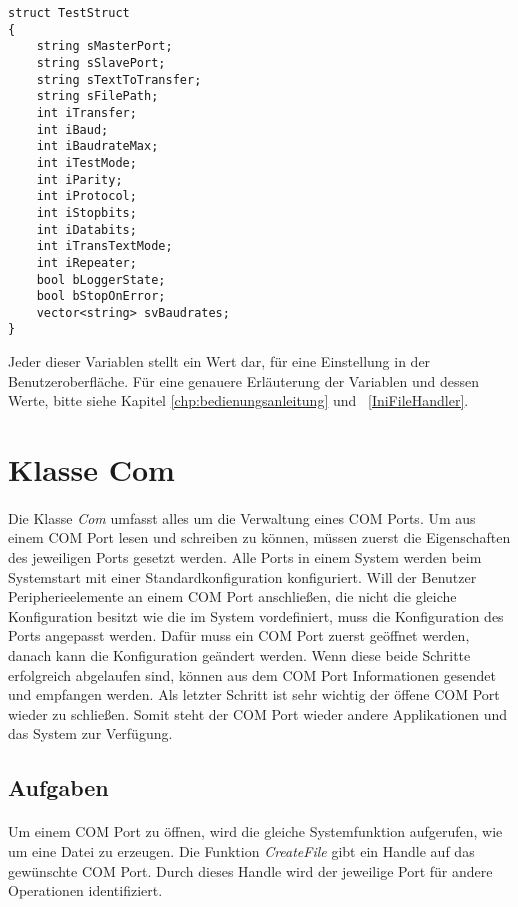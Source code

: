 \begin{lstlisting}	 
struct TestStruct
{
	string sMasterPort;
	string sSlavePort;
	string sTextToTransfer;
	string sFilePath;
	int iTransfer;
	int iBaud;
	int iBaudrateMax;
	int iTestMode;
	int iParity;
	int iProtocol;
	int iStopbits;
	int iDatabits;
	int iTransTextMode;
	int iRepeater;
	bool bLoggerState;
	bool bStopOnError;
	vector<string> svBaudrates;
}
\end{lstlisting}

Jeder dieser Variablen stellt ein Wert dar, für eine Einstellung in der Benutzeroberfläche. Für eine genauere Erläuterung der Variablen und dessen Werte, bitte siehe Kapitel \ref{chp:bedienungsanleitung} und ~\ref{IniFileHandler}.

\newpage


\section{Klasse Com}
\paragraph{}
Die Klasse \textit{Com} umfasst alles um die Verwaltung eines COM Ports. Um aus einem COM Port lesen und schreiben zu können, müssen zuerst die Eigenschaften des jeweiligen Ports gesetzt werden. Alle Ports in einem System werden beim Systemstart mit einer Standardkonfiguration konfiguriert. Will der Benutzer Peripherieelemente an einem COM Port anschließen, die nicht die gleiche Konfiguration besitzt wie die im System vordefiniert, muss die Konfiguration des Ports angepasst werden. Dafür muss ein COM Port zuerst geöffnet werden, danach kann die Konfiguration geändert werden. Wenn diese beide Schritte erfolgreich abgelaufen sind, können aus dem COM Port Informationen gesendet und empfangen werden. Als letzter Schritt ist sehr wichtig der öffene COM Port wieder zu schließen. Somit steht der COM Port wieder andere Applikationen und das System zur Verfügung.\\

\subsection{Aufgaben}
\paragraph{}
Um einem COM Port zu öffnen, wird die gleiche Systemfunktion aufgerufen, wie um eine Datei zu erzeugen. Die Funktion \textit{CreateFile} gibt ein Handle auf das gewünschte COM Port. Durch dieses Handle wird der jeweilige Port für andere Operationen identifiziert.


